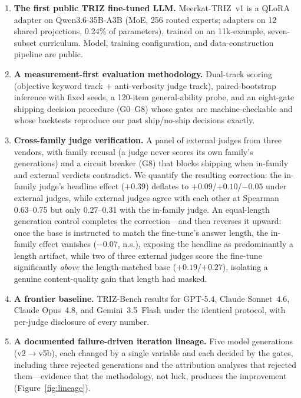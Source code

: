 \documentclass[11pt]{article}
\newcommand{\model}{Meerkat-TRIZ}
\begin{document}
\begin{enumerate}
  \item \textbf{The first public TRIZ fine-tuned LLM.} \model~v1 is a
  QLoRA adapter on Qwen3.6-35B-A3B (MoE, 256 routed experts; adapters on
  12 shared projections, 0.24\% of parameters), trained on an
  11k-example, seven-subset curriculum. Model, training configuration,
  and data-construction pipeline are public.
  \item \textbf{A measurement-first evaluation methodology.} Dual-track
  scoring (objective keyword track $+$ anti-verbosity judge track),
  paired-bootstrap inference with fixed seeds, a 120-item
  general-ability probe, and an eight-gate shipping decision procedure
  (G0--G8) whose gates are machine-checkable and whose backtests
  reproduce our past ship/no-ship decisions exactly.
  \item \textbf{Cross-family judge verification.} A panel of external
  judges from three vendors, with family recusal (a judge never scores
  its own family's generations) and a circuit breaker (G8) that blocks
  shipping when in-family and external verdicts contradict. We quantify
  the resulting correction: the in-family judge's headline effect
  ($+0.39$) deflates to $+0.09$/$+0.10$/$-0.05$ under external judges,
  while external judges agree with each other at Spearman
  0.63--0.75 but only 0.27--0.31 with the in-family judge. An
  equal-length generation control completes the correction---and then
  reverses it upward: once the base is instructed to match the
  fine-tune's answer length, the in-family effect vanishes ($-0.07$,
  n.s.), exposing the headline as predominantly a length artifact,
  while two of three external judges score the fine-tune significantly
  \emph{above} the length-matched base ($+0.19$/$+0.27$), isolating a
  genuine content-quality gain that length had masked.
  \item \textbf{A frontier baseline.} TRIZ-Bench results for GPT-5.4,
  Claude Sonnet~4.6, Claude Opus~4.8, and Gemini~3.5~Flash under the
  identical protocol, with per-judge disclosure of every number.
  \item \textbf{A documented failure-driven iteration lineage.} Five
  model generations (v2$\to$v5b), each changed by a single variable and
  each decided by the gates, including three rejected generations and the
  attribution analyses that rejected them---evidence that the
  methodology, not luck, produces the improvement
  (Figure~\ref{fig:lineage}).
\end{enumerate}
\end{document}
